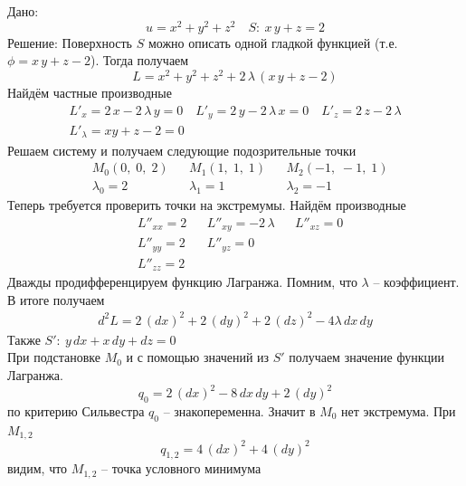 \begin{Example}
    Дано:
    \[
        u = x^2 + y^2 + z^2 \quad S:\: x\,y + z = 2
    \]
    Решение:
    Поверхность $S$ можно описать одной гладкой функцией (т.е. $\phi = x\,y + z - 2$). Тогда получаем
    \begin{equation*}
        L = x^2 + y^2 + z^2 + 2\,\lambda\,(x\,y + z - 2)
    \end{equation*}
    Найдём частные производные
    \begin{gather*}
        L'_x = 2\,x - 2\,\lambda\,y = 0 \quad L'_y = 2\,y - 2\,\lambda\,x = 0 \quad L'_z = 2\,z - 2\,\lambda \\ L'_{\lambda} = xy + z - 2 = 0
    \end{gather*}
    Решаем систему и получаем следующие подозрительные точки
    \begin{align*}
        &M_0(0,\; 0,\; 2) && M_1(1,\; 1,\; 1) && M_2(-1,\; -1,\; 1)\\
        & \lambda_0 = 2 && \lambda_1 = 1 && \lambda_2 = -1
    \end{align*}
    Теперь требуется проверить точки на экстремумы. Найдём производные
    \begin{align*}
        &L''_{xx} = 2 && L''_{xy} = -2\,\lambda && L''_{xz} = 0 \\
        &L''_{yy} = 2 && L''_{yz} = 0\\
        &L''_{zz} = 2
    \end{align*}
    Дважды продифференцируем функцию Лагранжа. Помним, что $\lambda$ -- коэффициент. В итоге получаем
    \begin{gather*}
        d^2L = 2\,(dx)^2 + 2\,(dy)^2 + 2\,(dz)^2 - 4\lambda\,dx\,dy
    \end{gather*}
    Также $S':\: y\,dx + x\,dy + dz = 0$\\
    При подстановке $M_0$ и с помощью значений из $S'$ получаем значение функции Лагранжа.
    \[
        q_0 = 2\,(dx)^2 - 8\,dx\,dy + 2\,(dy)^2
    \]
    по критерию Сильвестра $q_0$ -- знакопеременна. Значит в $M_0$ нет экстремума.
    При $M_{1,2}$
    \[
        q_{1,2} = 4\,(dx)^2 + 4\,(dy)^2
    \]
    видим, что $M_{1,2}$ -- точка условного минимума
\end{Example}